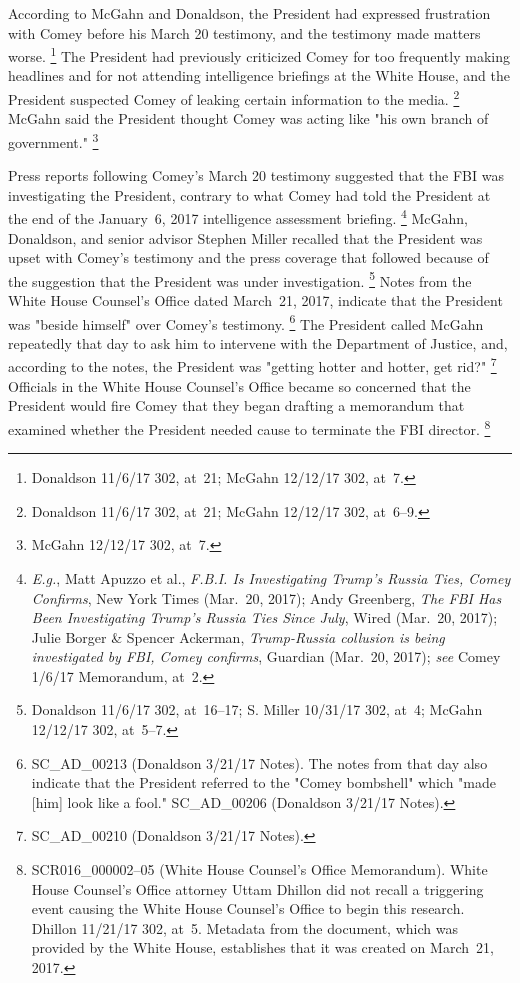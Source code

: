 According to McGahn and Donaldson, the President had expressed frustration with Comey before his March 20 testimony, and the testimony made matters worse.%
\footnote{Donaldson 11/6/17 302, at~21;
McGahn 12/12/17 302, at~7.}
The President had previously criticized Comey for too frequently making headlines and for not attending intelligence briefings at the White House, and the President suspected Comey of leaking certain information to the media.%
\footnote{Donaldson 11/6/17 302, at~21;
McGahn 12/12/17 302, at~6--9.}
McGahn said the President thought Comey was acting like "his own branch of government."%
\footnote{McGahn 12/12/17 302, at~7.}

Press reports following Comey's March 20 testimony suggested that the FBI was investigating the President, contrary to what Comey had told the President at the end of the January~6, 2017 intelligence assessment briefing.%
\footnote{\textit{E.g.}, Matt Apuzzo et al., \textit{F.B.I. Is Investigating Trump's Russia Ties, Comey Confirms}, New York Times (Mar.~20, 2017);
Andy Greenberg, \textit{The FBI Has Been Investigating Trump's Russia Ties Since July}, Wired (Mar.~20, 2017);
Julie Borger \& Spencer Ackerman, \textit{Trump-Russia collusion is being investigated by FBI, Comey confirms}, Guardian (Mar.~20, 2017);
\textit{see} Comey 1/6/17 Memorandum, at~2.}
McGahn, Donaldson, and senior advisor Stephen Miller recalled that the President was upset with Comey's testimony and the press coverage that followed because of the suggestion that the President was under investigation.%
\footnote{Donaldson 11/6/17 302, at~16--17;
S. Miller 10/31/17 302, at~4;
McGahn 12/12/17 302, at~5--7.}
Notes from the White House Counsel's Office dated March~21, 2017, indicate that the President was "beside himself" over Comey's testimony.%
\footnote{SC\_AD\_00213 (Donaldson 3/21/17 Notes).
The notes from that day also indicate that the President referred to the "Comey bombshell" which "made [him] look like a fool."
SC\_AD\_00206 (Donaldson 3/21/17 Notes).}
The President called McGahn repeatedly that day to ask him to intervene with the Department of Justice, and, according to the notes, the President was "getting hotter and hotter, get rid?"%
\footnote{SC\_AD\_00210 (Donaldson 3/21/17 Notes).}
Officials in the White House Counsel's Office became so concerned that the President would fire Comey that they began drafting a memorandum that examined whether the President needed cause to terminate the FBI director.%
\footnote{SCR016\_000002--05 (White House Counsel's Office Memorandum).
White House Counsel's Office attorney Uttam Dhillon did not recall a triggering event causing the White House Counsel's Office to begin this research.
Dhillon 11/21/17 302, at~5.
Metadata from the document, which was provided by the White House, establishes that it was created on March~21, 2017.}

